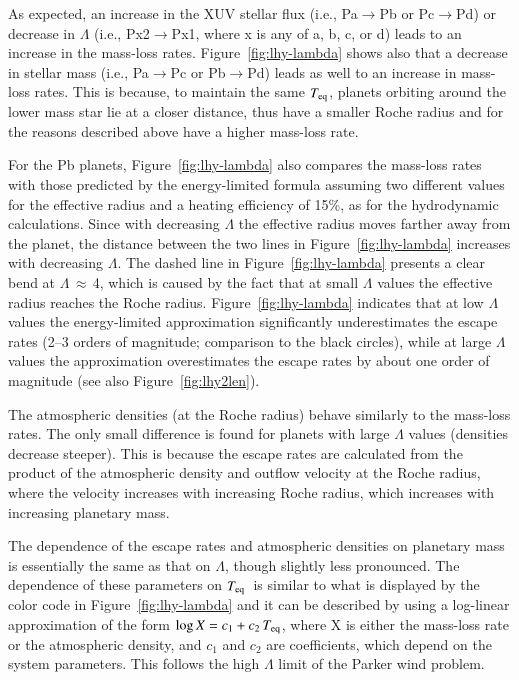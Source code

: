 \documentclass{aa}
\def\Teq{$T_{\rm eq}$}
\begin{document}
As expected, an increase in the XUV stellar flux (i.e., Pa$\rightarrow$Pb or Pc$\rightarrow$Pd) or decrease in $\Lambda$ (i.e., Px2$\rightarrow$Px1, where x is any of a, b, c, or d) leads to an increase in the mass-loss rates. Figure~\ref{fig:lhy-lambda} shows also that a decrease in stellar mass (i.e., Pa$\rightarrow$Pc or Pb$\rightarrow$Pd) leads as well to an increase in mass-loss rates. This is because, to maintain the same \Teq, planets orbiting around the lower mass star lie at a closer distance, thus have a smaller Roche radius and for the reasons described above have a higher mass-loss rate.

For the Pb planets, Figure~\ref{fig:lhy-lambda} also compares the mass-loss rates with those predicted by the energy-limited formula assuming two different values for the effective radius and a heating efficiency of 15\%, as for the hydrodynamic calculations. Since with decreasing $\Lambda$ the effective radius moves farther away from the planet, the distance between the two lines in Figure~\ref{fig:lhy-lambda} increases with decreasing $\Lambda$. The dashed line in Figure~\ref{fig:lhy-lambda} presents a clear bend at $\Lambda$\,$\approx$\,4, which is caused by the fact that at small $\Lambda$ values the effective radius reaches the Roche radius. Figure~\ref{fig:lhy-lambda} indicates that at low $\Lambda$ values the energy-limited approximation significantly underestimates the escape rates (2--3 orders of magnitude; comparison to the black circles), while at large $\Lambda$ values the approximation overestimates the escape rates by about one order of magnitude (see also Figure~\ref{fig:lhy2len}).

The atmospheric densities (at the Roche radius) behave similarly to the mass-loss rates. The only small difference is found for planets with large $\Lambda$ values (densities decrease steeper). This is because the escape rates are calculated from the product of the atmospheric density and outflow velocity at the Roche radius, where the velocity increases with increasing Roche radius, which increases with increasing planetary mass.

The dependence of the escape rates and atmospheric densities on
planetary mass is essentially the same as that on $\Lambda$,
though slightly less pronounced. The dependence of these
parameters on \Teq\ is similar to what is displayed by the color
code in Figure~\ref{fig:lhy-lambda} and it can be described by
using a log-linear approximation of the form $\log{X} = c_1 +
c_2\,T_{\rm eq}$, where X is either the mass-loss rate or the
atmospheric density, and $c_1$ and $c_2$ are coefficients, which
depend on the system parameters. {This follows the high $\Lambda$
limit of the Parker wind problem.}
%
\end{document}
